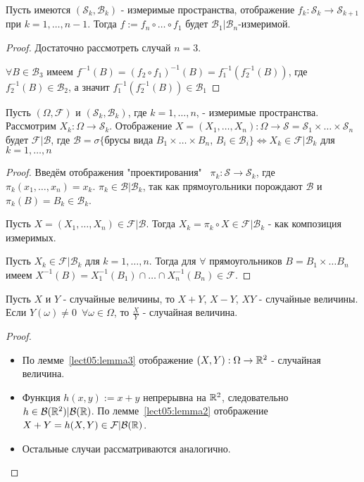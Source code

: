 \begin{lemma}\label{lect05:lemma2}
	Пусть имеются $(\mathcal{S}_k, \mathcal{B}_k)$ - измеримые пространства, отображение $f_k : \mathcal{S}_k \to \mathcal{S}_{k+1}$ при $k = 1 , \dots, n-1$. Тогда $f := f_n \circ \dots \circ f_1$ будет $\mathcal{B}_1 | \mathcal{B}_n$-измеримой.
\end{lemma}
\begin{proof}
	Достаточно рассмотреть случай $n = 3$.
	
	$\forall B \in \mathcal{B}_3$ имеем $f^{-1}(B) = (f_2 \circ f_1)^{-1}(B) = f^{-1}_1(f^{-1}_2(B))$, где $f^{-1}_2(B) \in \mathcal{B}_2$, а значит $f^{-1}_1(f^{-1}_2(B)) \in \mathcal{B}_1$
\end{proof}   
\begin{lemma}\label{lect05:lemma3}
	Пусть $(\Omega, \mathcal{F})$ и $(\mathcal{S}_k, \mathcal{B}_k)$, где $k = 1, \dots, n$, - измеримые пространства. Рассмотрим $X_k: \Omega \to \mathcal{S}_k$. Отображение $X = (X_1, \dots, X_n) : \Omega \to \mathcal{S}= \mathcal{S}_1 \times \dots \times \mathcal{S}_n$ будет $\mathcal{F}|\mathcal{B}$, где $\mathcal{B} = \sigma \{$брусы вида $B_1 \times \dots \times B_n$,  $B_i \in \mathcal{B}_i \} \iff X_k \in \mathcal{F}|\mathcal{B}_k$ для $k = 1, \dots, n$
\end{lemma}
\begin{proof}
	Введём отображения "проектирования" \, $\pi_k : \mathcal{S} \to \mathcal{S}_k$, где $\pi_k(x_1, \dots, x_n) = x_k$. $\pi_k \in \mathcal{B}|\mathcal{B}_k$, так как прямоугольники порождают $\mathcal{B}$ и $\pi_k(B) = B_k \in \mathcal{B}_k$.
	
	
	\fbox{$\implies$} Пусть $X = (X_1, \dots, X_n) \in \mathcal{F}|\mathcal{B}$. Тогда $X_k = \pi_k \circ X \in \mathcal{F}|\mathcal{B}_k$ - как композиция измеримых.
	
	
	\fbox{$\impliedby$} Пусть $X_k \in \mathcal{F}|\mathcal{B}_k$ для $k = 1, \dots, n$. Тогда для $\forall$ прямоугольников $B = B_1 \times \dots B_n$ имеем $X^{-1}(B) = X^{-1}_1(B_1) \cap \dots \cap X^{-1}_n(B_n) \in \mathcal{F}$.
	
\end{proof}   
\begin{theorem}\label{lect05:th2}
	Пусть $X$ и $Y$ - случайные величины, то $X+Y$, $X-Y$, $XY$ - случайные величины. Если $Y(\omega) \neq 0 $ $\, \forall \omega \in \Omega$, то $\frac{X}{Y}$ - случайная величина.
\end{theorem}
\begin{proof}\,
	
	\begin{itemize}
		\item  По лемме~\ref{lect05:lemma3} отображение $(X, Y): \Omega \to \mathbb{R}^2$ - случайная величина.
		\item Функция $h(x, y) := x+y$ непрерывна на $\mathbb{R}^2$, следовательно $h \in \mathcal{B}(\mathbb{R}^2)|\mathcal{B}(\mathbb{R})$. По лемме~\ref{lect05:lemma2} отображение $X + Y = h(X, Y) \in \mathcal{F}|\mathcal{B}(\mathbb{R})$.
		\item Остальные случаи рассматриваются аналогично.
	\end{itemize}      
	
\end{proof}


